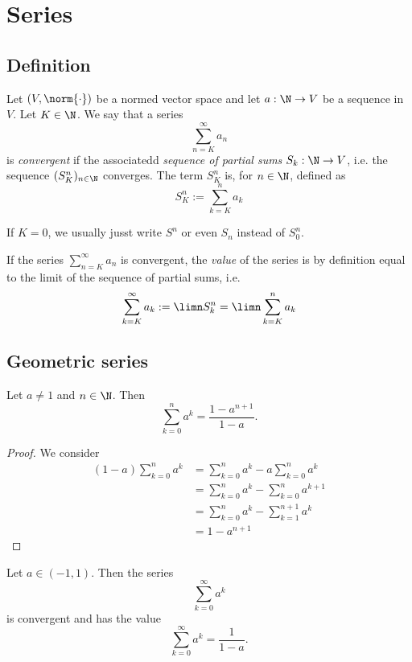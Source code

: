 \section{Series}

\subsection{Definition}
\begin{definition}
    Let $(V, \norm{\cdot})$ be a normed vector space and let $a: \N \to V$ be a sequence in $V$. Let $K \in \N$. We say that a series
    $$\sum_{n=K}^{\infty}a_n$$
    is \emph{convergent} if the associatedd \emph{sequence of partial sums} $S_k:\N \to V$, i.e. the sequence $(S_K^n)_{n\in\N}$ converges. The term $S_K^n$ is, for $n \in \N$, defined as
    $$S_K^n:= \sum_{k=K}^na_k$$

    If $K = 0$, we usually jusst write $S^n$ or even $S_n$ instead of $S_0^n$.

    If the series $\sum_{n=K}^\infty a_n$ is convergent, the \emph{value} of the series is by definition equal to the limit of  the sequence of partial sums, i.e.
    $$\sum_{k=K}^\infty a_k := \limn S_k^n = \limn \sum_{k=K}^n a_k$$
\end{definition}

\subsection{Geometric series}
\begin{proposition}
    Let $a \ne 1$ and $n \in \N$. Then
    $$\sum_{k=0}^n a^k = \frac{1-a^{n+1}}{1-a}.$$
\end{proposition}
\begin{proof}
    We consider
    \begin{align*}
        (1-a)\sum_{k=0}^n a^k &= \sum_{k=0}^n a^k - a\sum_{k=0}^n a^k  \\
                              &= \sum_{k=0}^n a^k - \sum_{k=0}^n a^{k+1} \\
                              &= \sum_{k=0}^n a^k - \sum_{k=1}^{n+1} a^k \\
                              &= 1 - a^{n+1}
    \end{align*}
\end{proof}

\begin{proposition}
    Let $a \in (-1,1)$. Then the series
    $$\sum_{k=0}^\infty a^k$$
    is convergent and has the value
    $$\sum_{k=0}^\infty a^k = \frac{1}{1-a}.$$
\end{proposition}

